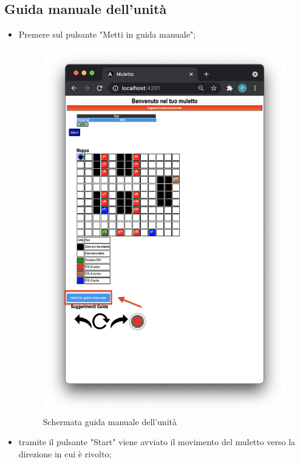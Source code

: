 \subsection{Guida manuale dell'unità}
\begin{itemize}
    \item Premere sul pulsante "Metti in guida manuale";
    \begin{figure}[H]
        \centering
          \includegraphics[scale=0.45]{res/images/forklift_guidamanuale.png}
          \caption{Schermata guida manuale dell'unità}
    \end{figure}
    \item tramite il pulsante "Start" viene avviato il movimento del muletto verso la direzione in cui è rivolto;
    \begin{figure}[H]

\end{figure}
\end{itemize}
